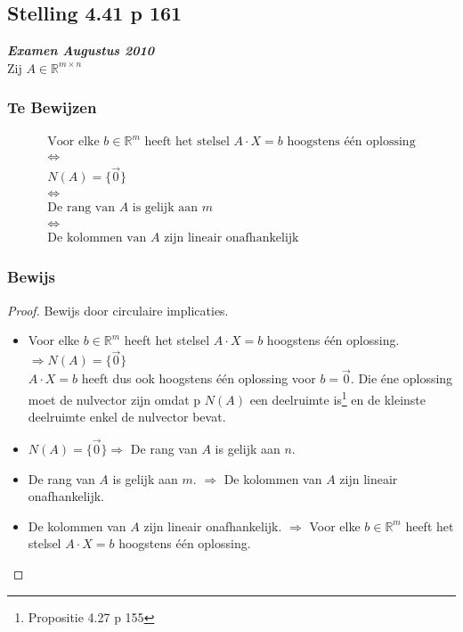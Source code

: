 \documentclass[lineaire_algebra_oplossingen.tex]{subfiles}
\begin{document}
\subsection{Stelling 4.41 p 161}
\label{4.41}
\textit{\textbf{Examen Augustus 2010}}\\
Zij $A \in \mathbb{R}^{m\times n}$

\subsubsection*{Te Bewijzen}
\begin{gather*}
\text{Voor elke $b \in \mathbb{R}^m$ heeft het stelsel $A\cdot X = b$ hoogstens \'e\'en oplossing} \\
\Leftrightarrow \\
N(A) = \{\vec{0}\} \\
\Leftrightarrow \\
\text{De rang van $A$ is gelijk aan $m$} \\
\Leftrightarrow \\
\text{De kolommen van $A$ zijn lineair onafhankelijk}
\end{gather*}

\subsubsection*{Bewijs}
\begin{proof}
Bewijs door circulaire implicaties.
\begin{itemize}
\item
Voor elke $b \in \mathbb{R}^m$ heeft het stelsel $A\cdot X = b$ hoogstens \'e\'en oplossing.
 $\Rightarrow N(A) = \{\vec{0}\}$\\
$A\cdot X = b$ heeft dus ook hoogstens \'e\'en oplossing voor $b = \vec{0}$. Die \'ene oplossing moet de nulvector zijn omdat  p $N(A)$ een deelruimte is\footnote{Propositie 4.27 p 155} en de kleinste deelruimte enkel de nulvector bevat.

\item
$N(A) = \{\vec{0}\} \Rightarrow $ De rang van $A$ is gelijk aan $n$.


\item
De rang van $A$ is gelijk aan $m$. $\Rightarrow$ De kolommen van $A$ zijn lineair onafhankelijk.


\item
De kolommen van $A$ zijn lineair onafhankelijk. $\Rightarrow$ Voor elke $b \in \mathbb{R}^m$ heeft het stelsel $A\cdot X = b$ hoogstens \'e\'en oplossing.

\end{itemize}
\end{proof}
\end{document}
